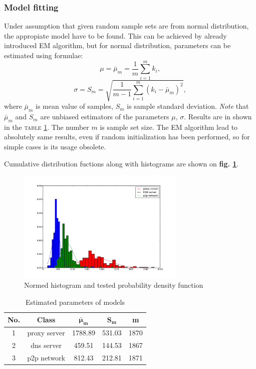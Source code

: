 \documentclass[a4paper,journal]{IEEEtran}
\begin{document}
\subsubsection{Model fitting}
Under assumption that given random sample sets are from normal distribution,
the appropiate model have to be found. 
This can be achieved by already introduced EM algorithm, but for normal distribution, 
parameters can be estimated using formulae:
\begin{equation}
\mu = \bar\mu_m = \frac{1}{m}\sum^m_{i=1}k_{i},
\end{equation}
\begin{equation}
\sigma = S_m = \sqrt{\frac{1}{m-1}\sum^m_{i=1}(k_{i}-\bar\mu_m)^2},
\end{equation}
where $\bar\mu_m$ is mean value of samples, $ S_m$ is sample standard deviation.
\emph{Note} that $\bar\mu_m$ and  $ S_m$ are unbiased estimators of the parameters $\mu$, $\sigma$.
Results are in shown in the \textsc{table \ref{tbl:params}}. The number $m$ is sample set size.
The EM algorithm lead to absolutely same results, even if random initialization has been performed, 
so for simple cases is its usage obsolete.

Cumulative distribution fuctions along with histograms are shown on \textbf{fig. \ref{fig:hist}}.

\begin{figure}[t]%
  \centering
  \includegraphics[width=80mm]{hist_gauspdf_dst}
  \caption{Normed histogram and tested probability density function}
  \label{fig:hist}
\end{figure}

\begin{table}[!h]
\caption{Estimated parameters of models}
\begin{center}
\begin{tabular}{|c|c|c|c|c|}\hline
\textbf{No.} & \textbf{Class}  & $\mathbf{\bar\mu_m}$ & $\mathbf{S_m}$ & \textbf{m} \\ \hline
1 & proxy server & 1788.89 & 531.03 & 1870 \\ \hline
2 & dns server & 459.51 & 144.53 & 1867 \\ \hline
3 & p2p network & 812.43 & 212.81  & 1871 \\ \hline
\end{tabular}
\end{center}
\label{tbl:params}
\end{table}
\end{document}
